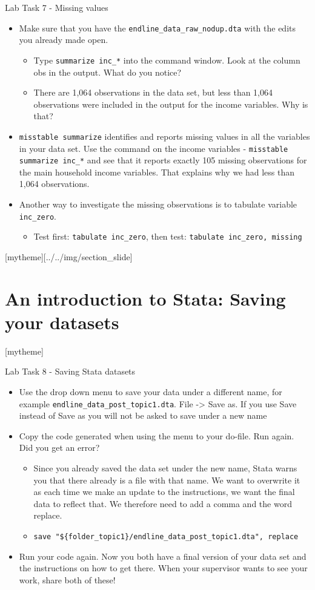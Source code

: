 \documentclass[aspectratio=169]{beamer}
\newcommand{\sectionpic}[2]{
	\setbeamertemplate{section page}[mytheme][#2]
	\section{#1}
	\setbeamertemplate{section page}[mytheme]
}
\begin{document}
\begin{frame}{Lab Task 7 - Missing values}
	\begin{itemize}
		\item Make sure that you have the \texttt{endline\_data\_raw\_nodup.dta} with the edits you already made open.
		\begin{itemize}
			\item Type \texttt{summarize inc\_*} into the command window. Look at the column obs in the output. What do you notice?
			\item There are  1,064 observations in the data set, but less than 1,064 observations were included in the output for the income variables. Why is that?
		\end{itemize}
		\item \texttt{misstable summarize} identifies and reports missing values in all the variables in your data set. Use the command on the income variables - \texttt{misstable summarize inc\_*} and see that it reports exactly 105 missing observations for the main household income variables. That explains why we had less than 1,064 observations.
		\item Another way to investigate the missing observations is to tabulate variable \texttt{inc\_zero}.
		\begin{itemize}
			\item Test first: \texttt{tabulate inc\_zero}, then test: \texttt{tabulate inc\_zero, missing}
		\end{itemize}
	\end{itemize}
\end{frame}

\sectionpic{An introduction to Stata: \newline Saving your datasets}{../../img/section_slide}

\begin{frame}{Lab Task 8 - Saving Stata datasets}
	\begin{itemize}
		\item Use the drop down menu to save your data under a different name, for example \texttt{endline\_data\_post\_topic1.dta}. File -> Save as. If you use Save instead of Save as you will not be asked to save under a new name
		\item Copy the code generated when using the menu to your do-file. Run again. Did you get an error?
			\begin{itemize}
				\item Since you already saved the data set under the new name, Stata warns you that there already is a file with that name. We want to overwrite it as each time we make an update to the instructions, we want the final data to reflect that. We therefore need to add a comma and the word replace.
				\item \texttt{save "\$\{folder\_topic1\}/endline\_data\_post\_topic1.dta", replace}
			\end{itemize}
		\item Run your code again. Now you both have a final version of your data set and the instructions on how to get there. When your supervisor wants to see your work, share both of these!
	\end{itemize}
\end{frame}
\end{document}
